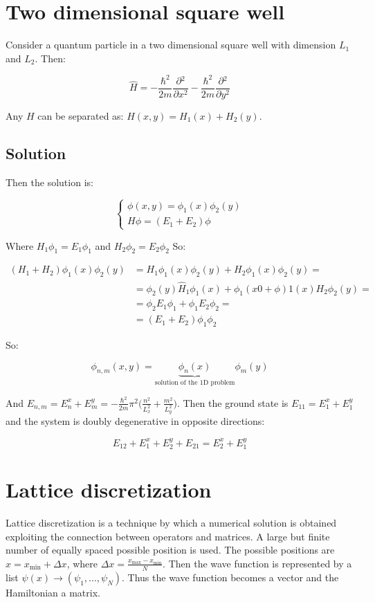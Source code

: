 \section{Two dimensional square well}
Consider a quantum particle in a two dimensional square well with dimension $L_1$ and $L_2$.
Then:

$$\hat{H} = -\frac{\hbar^2}{2m}\frac{\partial {^2}}{\partial {x^2}}-\frac{\hbar^2}{2m}\frac{\partial {^2}}{\partial {y^2}}$$

Any $H$ can be separated as: $H(x,y) = H_1(x) + H_2(y)$.

  \subsection{Solution}
  Then the solution is:

  $$\begin{cases}\phi(x,y) = \phi_1(x)\phi_2(y)\\H\phi=(E_1+E_2)\phi\end{cases}$$

  Where $H_1\phi_1 = E_1\phi_1$  and $H_2\phi_2 = E_2\phi_2$
  So:

  \begin{align*}
    (H_1 + H_2)\phi_1(x)\phi_2(y) &= H_1\phi_1(x)\phi_2(y) + H_2\phi_1(x)\phi_2(y)=\\
                                  &= \phi_2(y)\hat{H}_1\phi_1(x)+\phi_1(x0+\phi)1(x)H_2\phi_2(y)=\\
                                  &= \phi_2 E_1\phi_1 + \phi_1E_2\phi_2=\\
                                  &=(E_1+E_2)\phi_1\phi_2
  \end{align*}

  So:

  $$\phi_{n,m}(x,y) = \underbrace{\phi_n(x)}_{\text{solution of the 1D problem}}\phi_m(y)$$

  And $E_{n,m} = E_n^x+E_m^y = -\frac{\hbar^2}{2m}\pi^2\biggl(\frac{n^2}{L_x^2}+\frac{m^2}{L_y^2}\biggr)$.
  Then the ground state is $E_{11} = E_1^x+E_1^y$ and the system is doubly degenerative in opposite directions:

  $$E_{12} + E_1^x+E_2^y + E_{21} = E_2^x+E_1^y$$

\section{Lattice discretization}
Lattice discretization is a technique by which a numerical solution is obtained exploiting the connection between operators and matrices.
A large but finite number of equally spaced possible position is used.
The possible positions are $x = x_{\min} + \Delta x$, where $\Delta x = \frac{x_{\max}-x_{\min}}{N}$.
Then the wave function is represented by a list $\psi(x) \rightarrow(\psi_1,\dots, \psi_N)$.
Thus the wave function becomes  a vector and the Hamiltonian a matrix.

